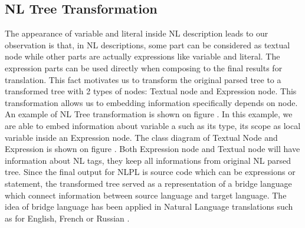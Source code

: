 \subsection{NL Tree Transformation}
The appearance of variable and literal inside NL description leads to our observation is that, in NL descriptions, some part can be considered as textual node while other parts are actually expressions like variable and literal. The expression parts can be used directly when composing to the final results for translation. This fact motivates us to transform the original parsed tree to a transformed tree with 2 types of nodes: Textual node and Expression node. This transformation allows us to embedding information specifically depends on node. An example of NL Tree transformation is shown on figure \cite{}.  In this example, we are able to embed information about variable a such as its type, its scope  as local variable inside an Expression node. The class diagram of Textual Node and Expression is shown on figure \cite{}. Both Expression node and Textual node will have information about NL tags, they keep all informations from original NL parsed tree. Since the final output for NLPL is source code which can be expressions or statement, the transformed tree served as a representation of a bridge language which connect information between source language and target language. The idea of bridge language has been applied in Natural Language translations such as for English, French or Russian \cite{}.

